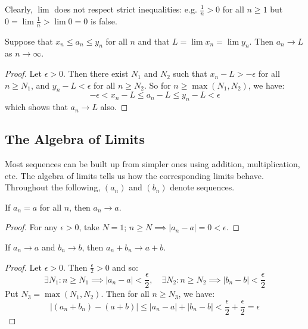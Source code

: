 \documentclass[11pt]{article}
\begin{document}
\begin{remark}
    Clearly, $\lim$ does not respect strict inequalities: e.g. $\frac{1}{n} > 0$ for all $n \geq 1$ but $0 = \lim \frac{1}{n} > \lim 0 = 0$ is false.
\end{remark}

\begin{theorem}
    Suppose that $x_n \leq a_n \leq y_n$ for all $n$ and that $L = \lim x_n = \lim y_n$. Then $a_n \to L$ as $n \to \infty$.
\end{theorem}

\begin{proof}
    Let $\epsilon > 0$. Then there exist $N_1$ and $N_2$ such that $x_n - L > -\epsilon$ for all $n \geq N_1$, and $y_n - L < \epsilon$ for all $n \geq N_2$. So for $n \geq \max(N_1, N_2)$, we have:
    \[
        -\epsilon < x_n - L \leq a_n - L \leq y_n - L < \epsilon
    \]
    which shows that $a_n \to L$ also.
\end{proof}

\subsection{The Algebra of Limits}
Most sequences can be built up from simpler ones using addition,
multiplication, etc. The algebra of limits tells us how the corresponding
limits behave. Throughout the following, $(a_n)$ and $(b_n)$ denote sequences.

\begin{proposition}
    If $a_n = a$ for all $n$, then $a_n \to a$.
\end{proposition}

\begin{proof}
    For any $\epsilon > 0$, take $N = 1$; $n \geq N \implies |a_n - a| = 0 < \epsilon$.
\end{proof}

\begin{proposition}
    If $a_n \to a$ and $b_n \to b$, then $a_n + b_n \to a + b$.
\end{proposition}

\begin{proof}
    Let $\epsilon > 0$. Then $\frac{\epsilon}{2} > 0$ and so:
    \[
        \exists N_1 : n \geq N_1 \implies |a_n - a| < \frac{\epsilon}{2}, \quad \exists N_2 : n \geq N_2 \implies |b_n - b| < \frac{\epsilon}{2}
    \]
    Put $N_3 = \max(N_1, N_2)$. Then for all $n \geq N_3$, we have:
    \[
        |(a_n + b_n) - (a + b)| \leq |a_n - a| + |b_n - b| < \frac{\epsilon}{2} + \frac{\epsilon}{2} = \epsilon
    \]
\end{proof}
\end{document}
